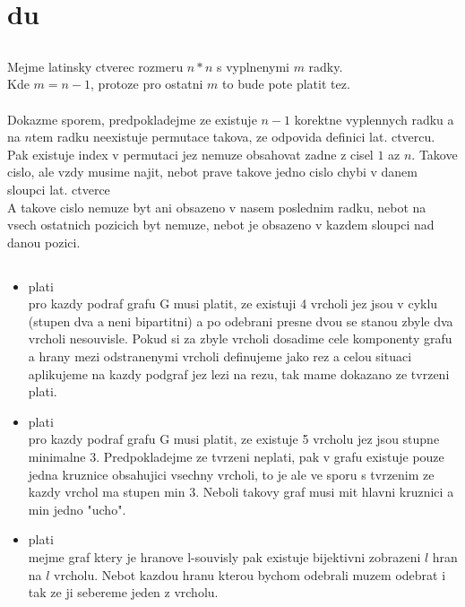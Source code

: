 \documentclass[a4paper]{article}
\begin{document}
\pagestyle{fancy}

\setcounter{section}{1}
\section{du}
\subsection{}
Mejme latinsky ctverec rozmeru $n*n$ s vyplnenymi $m$ radky.\\
Kde $m = n-1$, protoze pro ostatni $m$ to bude pote platit tez.\\
\\
Dokazme sporem, predpokladejme ze existuje $n-1$ korektne vyplennych
radku a na $n$tem radku neexistuje permutace takova, ze odpovida definici
lat. ctvercu.\\
Pak existuje index v permutaci jez nemuze obsahovat zadne z cisel $1$ az $n$.
Takove cislo, ale vzdy musime najit,
nebot prave takove jedno cislo chybi v danem sloupci lat. ctverce\\
A takove cislo nemuze byt ani obsazeno v nasem poslednim radku, nebot na vsech ostatnich pozicich byt nemuze, nebot je obsazeno v kazdem sloupci nad danou pozici.

\subsection{}
\begin{itemize}
\item plati\\
pro kazdy podraf grafu G musi platit, ze existuji 4 vrcholi jez jsou v cyklu
(stupen dva a neni bipartitni) a po odebrani presne dvou se stanou
zbyle dva vrcholi nesouvisle.
Pokud si za zbyle vrcholi dosadime cele komponenty grafu a hrany mezi
odstranenymi vrcholi definujeme jako rez a celou situaci aplikujeme
na kazdy podgraf jez lezi na rezu, tak mame dokazano ze tvrzeni plati.

\item plati\\
pro kazdy podraf grafu G musi platit, ze existuje 5 vrcholu jez jsou stupne minimalne 3. Predpokladejme ze tvrzeni neplati, pak v grafu existuje pouze jedna kruznice obsahujici vsechny vrcholi, to je ale ve sporu s tvrzenim ze kazdy vrchol ma stupen min 3. Neboli takovy graf musi mit hlavni kruznici a min jedno "ucho".

\item plati\\
mejme graf ktery je hranove l-souvisly pak existuje bijektivni zobrazeni $l$ hran na $l$ vrcholu. Nebot kazdou hranu kterou bychom odebrali muzem odebrat i tak ze ji sebereme jeden z vrcholu.
\end{itemize}
\end{document}
